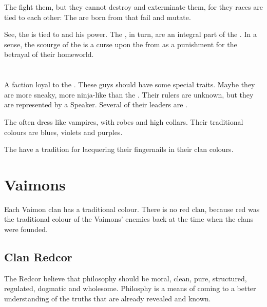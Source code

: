The \banes{} fight them, but they cannot destroy and exterminate them, for they races are tied to each other: The \soulreapers{} are born from \banes{} that fail and mutate.

See, the \banesz{} \matrixx{} is tied to \FatherErebos{} and his power. The \soulreapers, in turn, are an integral part of the \bane{} \matrixx. In a sense, the scourge of the \soulreapers{} is a curse upon the \banes{} from \FatherErebos{} as a punishment for the \banesz{} betrayal of their homeworld. 















\section{\TiphredSerah}
A \resphan{} faction loyal to the \banes. These guys should have some special traits. Maybe they are more sneaky, more ninja-like than the \KiriathSepher. Their rulers are unknown, but they are represented by a Speaker. Several of their leaders are \resphanesses. 

The \TiphredSerah{} often dress like vampires, with robes and high collars. Their traditional colours are blues, violets and purples.

The \TiphredSerah{} have a tradition for lacquering their fingernails in their clan colours. 















\section{Vaimons}
\label{Vaimon}
\label{Vaimons}

Each Vaimon clan has a traditional colour. There is no red clan, because red was the traditional colour of the Vaimons' enemies back at the time when the clans were founded. 









\subsection{Clan Redcor}
\label{Clan Redcor}
\label{Redcor}
\label{Redcor philosophy}
The Redcor believe that philosophy should be moral, clean, pure, structured, regulated, dogmatic and wholesome. Philosphy is a means of coming to a better understanding of the truths that are already revealed and known. 

